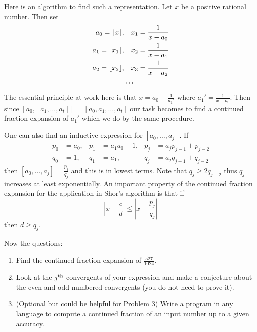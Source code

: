 Here is an algorithm to find such a representation.  Let $x$ be a positive rational number.  Then set 
\begin{align*}
a_0 = \lfloor x \rfloor, &\quad x_1 = \frac{1}{x-a_0} \\
a_1 = \lfloor x_1 \rfloor, &\quad x_2 = \frac{1}{x-a_1} \\
a_2 = \lfloor x_2 \rfloor, &\quad x_3 = \frac{1}{x-a_2} \\
&\cdots
\end{align*}
The essential principle at work here is that $x = a_0 + \frac{1}{a_1'}$ where $a_1' = \frac{1}{x-a_0}$.  Then 
since $[a_0, [a_1, \ldots, a_t]] = [a_0, a_1, \ldots, a_t]$ our task becomes to find a continued fraction expansion 
of $a_1'$ which we do by the same procedure.  

One can also find an inductive expression for $[a_0, \ldots, a_j]$.  If 
\begin{align*}
p_0 &= a_0, & p_1 &= a_1 a_0 + 1, & p_j &= a_j p_{j-1} + p_{j-2} \\
q_0 &= 1,  & q_1 &= a_1, & q_j &= a_j q_{j-1} + q_{j-2}
\end{align*}  
then $[a_0, \ldots, a_j] = \frac{p_j}{q_j}$ and this is in lowest terms.  Note that $q_j \ge 2 q_{j-2}$ thus $q_j$ increases 
at least exponentially.  An important property of the continued fraction expansion for the application in Shor's algorithm 
is that if 
\[
|x - \frac{c}{d}| \le |x - \frac{p_j}{q_j}|
\]
then $d \ge q_j$.  

Now the questions:
\begin{enumerate}
\item Find the continued fraction expansion of $\frac{527}{1024}$.  
\item Look at the $j^{\scriptsize \mbox{{\rm th}}}$ convergents of your expression and 
make a conjecture about the even and odd numbered convergents (you do not need to prove it).
\item (Optional but could be helpful for Problem 3) Write a program in any language to compute 
a continued fraction of an input number up to a given accuracy.
\end{enumerate}

